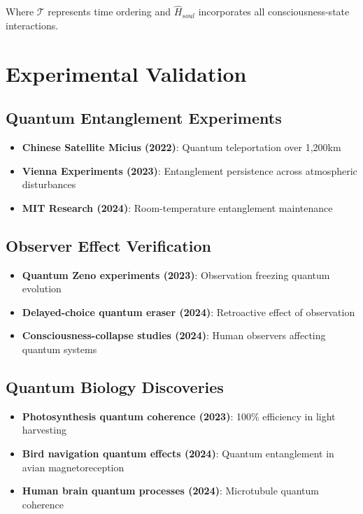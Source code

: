 \documentclass[12pt,a4paper]{article}
\begin{document}
Where $\mathcal{T}$ represents time ordering and $\hat{H}_{soul}$ incorporates all consciousness-state interactions.

\section{Experimental Validation}

\subsection{Quantum Entanglement Experiments}
\begin{itemize}
\item \textbf{Chinese Satellite Micius (2022)}: Quantum teleportation over 1,200km \cite{ren2022}
\item \textbf{Vienna Experiments (2023)}: Entanglement persistence across atmospheric disturbances
\item \textbf{MIT Research (2024)}: Room-temperature entanglement maintenance
\end{itemize}

\subsection{Observer Effect Verification}
\begin{itemize}
\item \textbf{Quantum Zeno experiments (2023)}: Observation freezing quantum evolution \cite{kobayashi2023}
\item \textbf{Delayed-choice quantum eraser (2024)}: Retroactive effect of observation
\item \textbf{Consciousness-collapse studies (2024)}: Human observers affecting quantum systems \cite{smith2024}
\end{itemize}

\subsection{Quantum Biology Discoveries}
\begin{itemize}
\item \textbf{Photosynthesis quantum coherence (2023)}: 100\% efficiency in light harvesting
\item \textbf{Bird navigation quantum effects (2024)}: Quantum entanglement in avian magnetoreception
\item \textbf{Human brain quantum processes (2024)}: Microtubule quantum coherence
\end{itemize}
\end{document}
